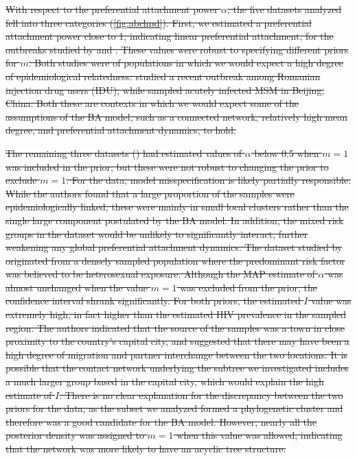 \documentclass[12pt]{article}\usepackage[]{graphicx}\usepackage[]{color}
\let\mref\cref
\let\mciteauthor\citeauthor
\renewcommand{\cref}[1]{\mbox{\mref{#1}}}
\renewcommand{\citeauthor}[1]{\mbox{\mciteauthor{#1}}}
\newcommand{\del}[1]{\color{red} \sout{#1} \color{black}}
\begin{document}
\del{With respect to the preferential attachment power $\alpha$, the five
datasets analyzed fell into three categories (\cref{fig:abchpd}). First, we
estimated a preferential attachment power close to 1, indicating linear
preferential attachment, for the outbreaks studied by
\textcite{niculescu2015recent} and \textcite{wang2015targeting}. These values
were robust to specifying different priors for $m$. Both studies were of
populations in which we would expect a high degree of epidemiological
relatedness: \textcite{niculescu2015recent} studied a recent outbreak among
Romanian injection drug users (IDU), while \citeauthor{wang2015targeting}
sampled acutely infected MSM in Beijing, China. Both these are contexts in
which we would expect some of the assumptions of the BA model, such as a
connected network, relatively high mean degree, and preferential attachment
dynamics, to hold.}

\del{The remaining three datasets (\textcite{cuevas2009hiv, novitsky2014impact,
li2015hiv}) had estimated values of $\alpha$ below 0.5 when $m = 1$ was
included in the prior, but these were not robust to changing the prior to
exclude $m = 1$. For the \citeauthor{cuevas2009hiv} data, model
misspecification is likely partially responsible. While the authors found that
a large proportion of the samples were epidemiologically linked, these were
mainly in small local clusters rather than the single large component
postulated by the BA model. In addition, the mixed risk groups in the dataset
would be unlikely to significantly interact, further weakening any global
preferential attachment dynamics. The dataset studied by
\textcite{novitsky2014impact} originated from a densely sampled population
where the predominant risk factor was believed to be heterosexual exposure.
Although the MAP estimate of $\alpha$ was almost unchanged when the value $m =
1$ was excluded from the prior, the confidence interval shrank significantly.
For both priors, the estimated $I$ value was extremely high, in fact higher
than the estimated HIV prevalence in the sampled region. The authors indicated
that the source of the samples was a town in close proximity to the country's
capital city, and suggested that there may have been a high degree of migration
and partner interchange between the two locations. It is possible that the
contact network underlying the subtree we investigated includes a much larger
group based in the capital city, which would explain the high estimate of $I$.
There is no clear explanation for the discrepancy between the two priors for
the \textcite{li2015hiv} data, as the subset we analyzed formed a phylogenetic
cluster and therefore was a good candidate for the BA model. However, nearly
all the posterior density was assigned to $m = 1$ when this value was allowed,
indicating that the network was more likely to have an acyclic tree structure.}
\end{document}
